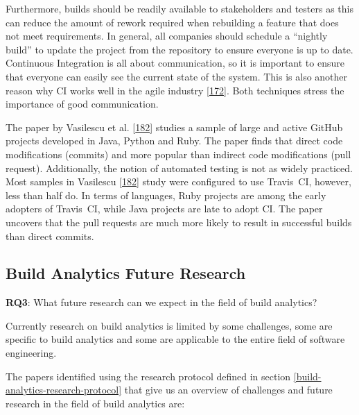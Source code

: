 \documentclass[]{book}
\begin{document}
Furthermore, builds should be readily available to stakeholders and
testers as this can reduce the amount of rework required when rebuilding
a feature that does not meet requirements. In general, all companies
should schedule a ``nightly build'' to update the project from the
repository to ensure everyone is up to date. Continuous Integration is
all about communication, so it is important to ensure that everyone can
easily see the current state of the system. This is also another reason
why CI works well in the agile industry
{[}\protect\hyperlink{ref-stolberg2009enabling}{172}{]}. Both techniques
stress the importance of good communication.

The paper by Vasilescu et al.
{[}\protect\hyperlink{ref-vasilescu2014continuous}{182}{]} studies a
sample of large and active GitHub projects developed in Java, Python and
Ruby. The paper finds that direct code modifications (commits) and more
popular than indirect code modifications (pull request). Additionally,
the notion of automated testing is not as widely practiced. Most samples
in Vasilescu {[}\protect\hyperlink{ref-vasilescu2014continuous}{182}{]}
study were configured to use Travis~CI, however, less than half do. In
terms of languages, Ruby projects are among the early adopters of
Travis~CI, while Java projects are late to adopt CI. The paper uncovers
that the pull requests are much more likely to result in successful
builds than direct commits.

\subsection{Build Analytics Future
Research}\label{build-analytics-future-research}

\textbf{RQ3}: What future research can we expect in the field of build
analytics?

Currently research on build analytics is limited by some challenges,
some are specific to build analytics and some are applicable to the
entire field of software engineering.

The papers identified using the research protocol defined in section
\ref{build-analytics-research-protocol} that give us an overview of
challenges and future research in the field of build analytics are:
\end{document}
